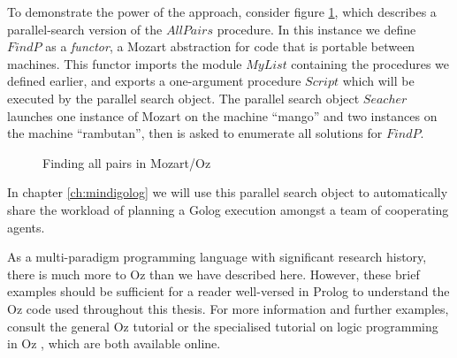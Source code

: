 To demonstrate the power of the approach, consider figure \ref{fig:Background:Parallel-All-Pairs},
which describes a parallel-search version of the $AllPairs$ procedure.
In this instance we define $FindP$ as a \emph{functor}, a Mozart
abstraction for code that is portable between machines. This functor
imports the module $MyList$ containing the procedures we defined
earlier, and exports a one-argument procedure $Script$ which will
be executed by the parallel search object. The parallel search object
$Seacher$ launches one instance of Mozart on the machine {}``mango''
and two instances on the machine {}``rambutan'', then is asked to
enumerate all solutions for $FindP$.

%
\begin{figure}[t]

\caption{Finding all pairs in Mozart/Oz\label{fig:Background:Parallel-All-Pairs}}

\end{figure}


In chapter \ref{ch:mindigolog} we will use this parallel search object
to automatically share the workload of planning a Golog execution
amongst a team of cooperating agents.

As a multi-paradigm programming language with significant research
history, there is much more to Oz than we have described here. However,
these brief examples should be sufficient for a reader well-versed
in Prolog to understand the Oz code used throughout this thesis. For
more information and further examples, consult the general Oz tutorial
\citep{haridi99oz_tutorial} or the specialised tutorial on logic
programming in Oz \citep{lpinoz99}, which are both available online.

